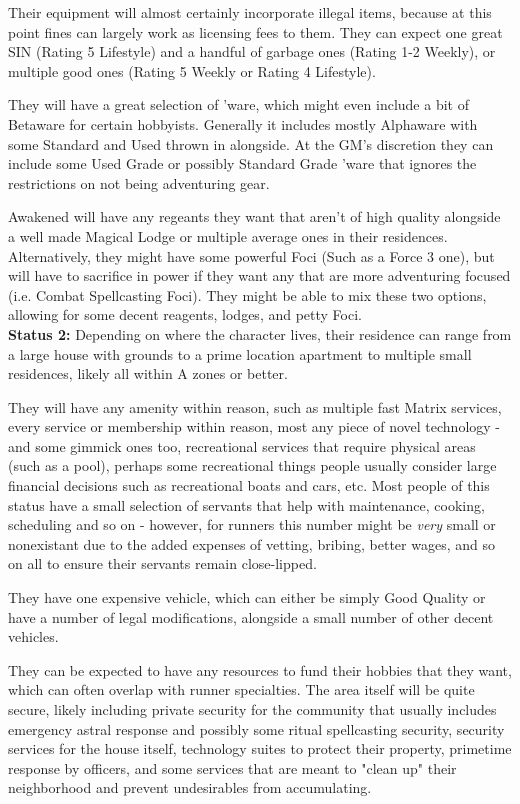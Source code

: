 \begin{multicols*}{2}
	Their equipment will almost certainly incorporate illegal items, because at this point fines can largely work as licensing fees to them. They can expect one great SIN (Rating 5 Lifestyle) and a handful of garbage ones (Rating 1-2 Weekly), or multiple good ones (Rating 5 Weekly or Rating 4 Lifestyle).
	
	They will have a great selection of 'ware, which might even include a bit of Betaware for certain hobbyists. Generally it includes mostly Alphaware with some Standard and Used thrown in alongside. At the GM's discretion they can include some Used Grade or possibly Standard Grade 'ware that ignores the restrictions on not being adventuring gear.
	
	Awakened will have any regeants they want that aren't of high quality alongside a well made Magical Lodge or multiple average ones in their residences. Alternatively, they might have some powerful Foci (Such as a Force 3 one), but will have to sacrifice in power if they want any that are more adventuring focused (i.e. Combat Spellcasting Foci). They might be able to mix these two options, allowing for some decent reagents, lodges, and petty Foci. \\
	
	\textbf{Status 2:} Depending on where the character lives, their residence can range from a large house with grounds to a prime location apartment to multiple small residences, likely all within A zones or better.
	
	They will have any amenity within reason, such as multiple fast Matrix services, every service or membership within reason, most any piece of novel technology - and some gimmick ones too, recreational services that require physical areas (such as a pool), perhaps some recreational things people usually consider large financial decisions such as recreational boats and cars, etc. Most people of this status have a small selection of servants that help with maintenance, cooking, scheduling and so on - however, for runners this number might be \textit{very} small or nonexistant due to the added expenses of vetting, bribing, better wages, and so on all to ensure their servants remain close-lipped.
	
	They have one expensive vehicle, which can either be simply Good Quality or have a number of legal modifications, alongside a small number of other decent vehicles. 
	
	They can be expected to have any resources to fund their hobbies that they want, which can often overlap with runner specialties. The area itself will be quite secure, likely including private security for the community that usually includes emergency astral response and possibly some ritual spellcasting security, security services for the house itself, technology suites to protect their property, primetime response by officers, and some services that are meant to "clean up" their neighborhood and prevent undesirables from accumulating. 
	

\end{multicols*}
